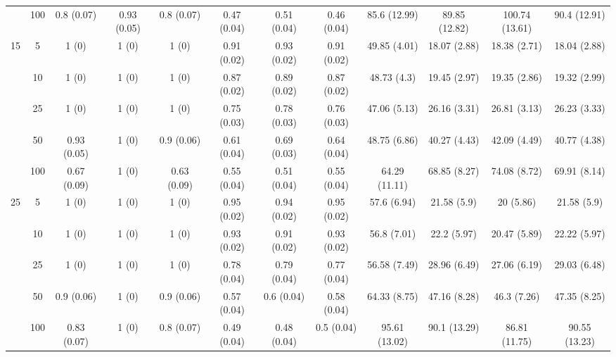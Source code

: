 \documentclass[11pt]{article}
\theoremstyle{definition}
\begin{document}
\begin{table}[H]
\begin{center}
{\begin{tabular}{cc|ccc|ccc|cccc|}
  & 100  & 0.8 (0.07) & 0.93 (0.05) & 0.8 (0.07) & 0.47 (0.04) & 0.51 (0.04) & 0.46 (0.04) & 85.6 (12.99) & 89.85 (12.82) & 100.74 (13.61) & 90.4 (12.91) \\[.3cm] 
  \multirow{5}{*}{15} & 5  & 1 (0) & 1 (0) & 1 (0) & 0.91 (0.02) & 0.93 (0.02) & 0.91 (0.02) & 49.85 (4.01) & 18.07 (2.88) & 18.38 (2.71) & 18.04 (2.88) \\ 
  & 10  & 1 (0) & 1 (0) & 1 (0) & 0.87 (0.02) & 0.89 (0.02) & 0.87 (0.02) & 48.73 (4.3) & 19.45 (2.97) & 19.35 (2.86) & 19.32 (2.99) \\ 
  & 25  & 1 (0) & 1 (0) & 1 (0) & 0.75 (0.03) & 0.78 (0.03) & 0.76 (0.03) & 47.06 (5.13) & 26.16 (3.31) & 26.81 (3.13) & 26.23 (3.33) \\ 
  & 50  & 0.93 (0.05) & 1 (0) & 0.9 (0.06) & 0.61 (0.04) & 0.69 (0.03) & 0.64 (0.04) & 48.75 (6.86) & 40.27 (4.43) & 42.09 (4.49) & 40.77 (4.38) \\ 
  & 100  & 0.67 (0.09) & 1 (0) & 0.63 (0.09) & 0.55 (0.04) & 0.51 (0.04) & 0.55 (0.04) & 64.29 (11.11) & 68.85 (8.27) & 74.08 (8.72) & 69.91 (8.14) \\[.3cm] 
  \multirow{5}{*}{25} & 5  & 1 (0) & 1 (0) & 1 (0) & 0.95 (0.02) & 0.94 (0.02) & 0.95 (0.02) & 57.6 (6.94) & 21.58 (5.9) & 20 (5.86) & 21.58 (5.9) \\ 
  & 10  & 1 (0) & 1 (0) & 1 (0) & 0.93 (0.02) & 0.91 (0.02) & 0.93 (0.02) & 56.8 (7.01) & 22.2 (5.97) & 20.47 (5.89) & 22.22 (5.97) \\ 
  & 25  & 1 (0) & 1 (0) & 1 (0) & 0.78 (0.04) & 0.79 (0.04) & 0.77 (0.04) & 56.58 (7.49) & 28.96 (6.49) & 27.06 (6.19) & 29.03 (6.48) \\ 
 & 50  & 0.9 (0.06) & 1 (0) & 0.9 (0.06) & 0.57 (0.04) & 0.6 (0.04) & 0.58 (0.04) & 64.33 (8.75) & 47.16 (8.28) & 46.3 (7.26) & 47.35 (8.25) \\ 
     & 100  & 0.83 (0.07) & 1 (0) & 0.8 (0.07) & 0.49 (0.04) & 0.48 (0.04) & 0.5 (0.04) & 95.61 (13.02) & 90.1 (13.29) & 86.81 (11.75) & 90.55 (13.23) \\
\end{tabular}}
   \end{center}
      \vspace{-.5cm}
\end{table}
\end{document}
